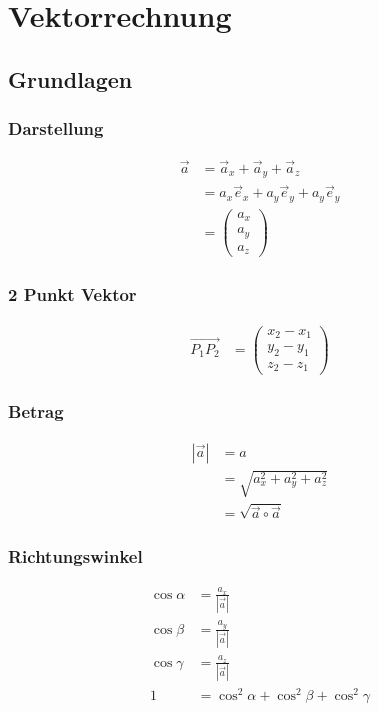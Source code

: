 \section{Vektorrechnung}

\subsection{Grundlagen}

\begin{multicols}{2}
\subsubsection*{Darstellung}
\begin{align*}
\vec{a}	&=\vec{a}_x+\vec{a}_y+\vec{a}_z\\
	&=a_x\vec{e}_x+a_y\vec{e}_y+a_y\vec{e}_y\\
	&=\begin{pmatrix} a_x\\ a_y\\a_z\end{pmatrix}
\end{align*}
\vfill
\subsubsection*{2 Punkt Vektor}
\begin{align*} 
\vec{P_1P_2} &=\begin{pmatrix} x_2-x_1\\ y_2-y_1\\z_2-z_1\end{pmatrix}
\end{align*}
\vfill
\end{multicols}

\begin{multicols}{2}
\subsubsection*{Betrag}
\begin{align*} 
|\vec{a}|	&=a\\
		&=\sqrt{a_x^2+a_y^2+a_z^2}\\
		&=\sqrt{\vec{a}\circ\vec{a}}
\end{align*}
\vfill
\subsubsection*{Richtungswinkel}
\begin{align*} 
\cos \alpha &= \frac{a_x}{|\vec{a}|}\\
\cos \beta &= \frac{a_y}{|\vec{a}|}\\
\cos \gamma &= \frac{a_z}{|\vec{a}|}\\
1&=\cos^2\alpha+\cos^2\beta+\cos^2\gamma
\end{align*}
\vfill
\end{multicols}

